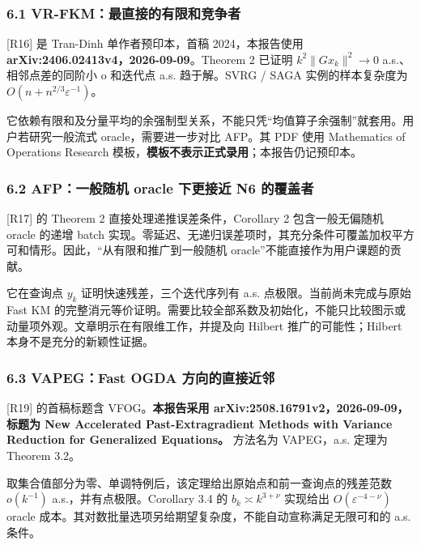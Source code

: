 \documentclass[
  chinese,
  10pt,
  a4paper,
]{article}
\begin{document}
\subsubsection{6.1
VR-FKM：最直接的有限和竞争者}\label{vr-fkmux6700ux76f4ux63a5ux7684ux6709ux9650ux548cux7adeux4e89ux8005}

{[}R16{]} 是 Tran-Dinh 单作者预印本，首稿 2024，本报告使用
\textbf{arXiv:2406.02413v4，2026-09-09}。Theorem 2 已证明
\(k^2\lVert Gx_k\rVert^2\to0\) a.s.、相邻点差的同阶小 o 和迭代点 a.s.
趋于解。SVRG / SAGA 实例的样本复杂度为
\(O(n+n^{2/3}\varepsilon^{-1})\)。

它依赖有限和及分量平均的余强制型关系，不能只凭``均值算子余强制''就套用。用户若研究一般流式
oracle，需要进一步对比 AFP。其 PDF 使用 Mathematics of Operations
Research 模板，\textbf{模板不表示正式录用}；本报告仍记预印本。

\subsubsection{6.2 AFP：一般随机 oracle 下更接近 N6
的覆盖者}\label{afpux4e00ux822cux968fux673a-oracle-ux4e0bux66f4ux63a5ux8fd1-n6-ux7684ux8986ux76d6ux8005}

{[}R17{]} 的 Theorem 2 直接处理递推误差条件，Corollary 2
包含一般无偏随机 oracle 的递增 batch
实现。零延迟、无递归误差项时，其充分条件可覆盖加权平方可和情形。因此，``从有限和推广到一般随机
oracle''不能直接作为用户课题的贡献。

它在查询点 \(y_k\) 证明快速残差，三个迭代序列有 a.s.
点极限。当前尚未完成与原始 Fast KM
的完整消元等价证明。需要比较全部系数及初始化，不能只比较图示或动量项外观。文章明示在有限维工作，并提及向
Hilbert 推广的可能性；Hilbert 本身不是充分的新颖性证据。

\subsubsection{6.3 VAPEG：Fast OGDA
方向的直接近邻}\label{vapegfast-ogda-ux65b9ux5411ux7684ux76f4ux63a5ux8fd1ux90bb}

{[}R19{]} 的首稿标题含 VFOG。\textbf{本报告采用
arXiv:2508.16791v2，2026-09-09，标题为 New Accelerated
Past-Extragradient Methods with Variance Reduction for Generalized
Equations。} 方法名为 VAPEG，a.s. 定理为 Theorem 3.2。

取集合值部分为零、单调特例后，该定理给出原始点和前一查询点的残差范数
\(o(k^{-1})\) a.s.，并有点极限。Corollary 3.4 的 \(b_k\asymp k^{3+\nu}\)
实现给出 \(O(\varepsilon^{-4-\nu})\) oracle
成本。其对数批量选项另给期望复杂度，不能自动宣称满足无限可和的 a.s.
条件。
\end{document}
